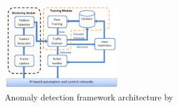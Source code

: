 \begin{figure}
	\centering
	\includegraphics[width=0.45\textwidth,keepaspectratio]{figures/300-Pan2014-architecture.png}
	\caption[Anomaly detection framework architecture by Pan, Hairi, and Al-Nashif]{Anomaly detection framework architecture by \textcite{Pan2014}}
	\label{fig:background:prior-work:pan-architecture}
\end{figure}

